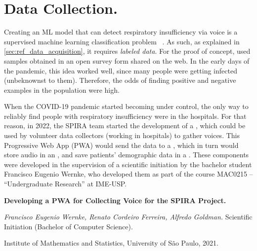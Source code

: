   \section{Data Collection.}\label{sec:spira_data_collection}
  Creating an ML model that can detect respiratory insufficiency
  via voice is a supervised machine learning classification problem%
  ~\parencite{Casanova2021DeepSpeech}. As such, as explained in
  \cref{sec:ref_data_acquisition}, it requires \emph{labeled data}.
  For the proof of concept, \citeauthor{Casanova2021DeepSpeech}
  used samples obtained in an open survey form shared on the web.
  In the early days of the pandemic, this idea worked well,
  since many people were getting infected (unbeknownst to them).
  Therefore, the odds of finding positive and negative examples
  in the population were high.
  
  When the COVID-19 pandemic started becoming under control, the only
  way to reliably find people with respiratory insufficiency were in the
  hospitals. For that reason, in 2022, the SPIRA team started the development
  of a , which could be used by volunteer
  data collectors (working in hospitals) to gather voices.
  This Progressive Web App (PWA) would send the data to a
  , which in turn would
  store audio in an , and
  save patients' demographic data in a .
  These components were developed in the supervision of a scientific
  initiation by the bachelor student Francisco Eugenio Wernke, who developed
  them as part of the course MAC0215 -- ``Undergraduate Research'' at IME-USP.
  \begin{supervision}
    \label{sup:ic_francisco}
    \noindent\textbf{%
      Developing a PWA for Collecting Voice for the SPIRA Project.
    }
  
    \noindent%
    \emph{%
      Francisco Eugenio Wernke,
      Renato Cordeiro Ferreira,
      Alfredo Goldman.
    }
  \noindent%
    Scientific Initiation (Bachelor of Computer Science).
  
    \noindent%
    Institute of Mathematics and Statistics, University of São Paulo, 2021.
  \end{supervision}
  
